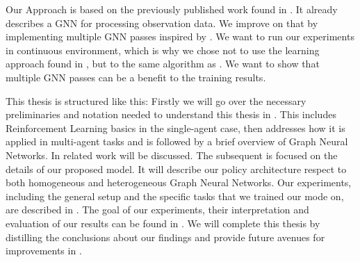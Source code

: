 Our Approach is based on the previously published work found in \citet{RobinRuede2021}. It already describes a GNN for processing observation data. We improve on that by implementing multiple GNN passes inspired by \citet{graphconvolutionMARL}. We want to run our experiments in continuous environment, which is why we chose not to use the learning approach found in \citet{graphconvolutionMARL}, but to the same algorithm as \citet{RobinRuede2021}. We want to show that multiple GNN passes can be a benefit to the training results.\par


This thesis is structured like this: Firstly we will go over the necessary preliminaries and notation needed to understand this thesis in . This includes Reinforcement Learning basics in the single-agent case, then addresses how it is applied in multi-agent tasks and is followed by a brief overview of Graph Neural Networks. In  related work will be discussed. The subsequent  is focused on the details of our proposed model. It will describe our policy architecture respect to both homogeneous and heterogeneous Graph Neural Networks. Our experiments, including the general setup and the specific tasks that we trained our mode on, are described in . The goal of our experiments, their interpretation and evaluation of our results can be found in . We will complete this thesis by distilling the conclusions about our findings and provide future avenues for improvements in . 